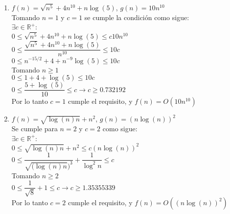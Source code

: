 \documentclass[10pt]{article}
\begin{document}
\begin{enumerate}
\begin{enumerate}
  \item $f(n) = \sqrt{n^5}+4n^{10}+n\log(5) $, $g(n) = 10n^{10}$\\
  Tomando $n = 1$ y $c = 1$ se cumple la condición como sigue:\\
  $\exists c\in\mathbb{R^+}$:\\
  $0\leq \sqrt{n^5}+4n^{10}+n\log(5)\leq c10n^{10}$\\
  $0\leq \dfrac{\sqrt{n^5}+4n^{10}+n\log(5)}{n^{10}}\leq 10c$\\
  $0\leq n^{-15/2}+4+n^{-9}\log(5)\leq 10c$\\Tomando $n \geq 1$\\
  $0\leq 1+4+\log(5)\leq 10c$\\
  $0\leq \dfrac{5+\log(5)}{10}\leq c \rightarrow c \geq 0.732192$\\
  Por lo tanto $c = 1$ cumple el requisito, y $f(n) = O(10n^{10})$\\
  \item $f(n) = \sqrt{\log(n)n}+n^2$, $g(n) = (n\log(n))^2$\\
  Se cumple para $n=2$ y $c = 2$ como sigue:\\
  $\exists c\in\mathbb{R^+}$:\\
  $0\leq \sqrt{\log(n)n}+n^2\leq c(n\log(n))^2$\\
  $0\leq \dfrac{1}{\sqrt{(\log(n)n})^3}+\dfrac{1}{\log^2 n}\leq c$\\Tomando $n\geq 2$\\$0\leq \dfrac{1}{\sqrt{8}}+1\leq c\rightarrow c\geq 1.35355339$\\
  Por lo tanto $c = 2$ cumple el requisito, y $f(n) = O((n\log(n))^2)$
\end{enumerate} 



\end{enumerate}
\end{document}
